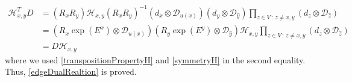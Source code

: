 \documentclass[10pt]{article}
\numberwithin{equation}{section}
\numberwithin{equation}{subsection}
\newcommand{\dd}{\mathcal{D}_{u(x)}}
\begin{document}

\begin{equation}
    \begin{split}
        \mathcal{H}_{x,y}^{T}D&=(R_{x}R_{y})\mathcal{H}_{x,y}(R_{x}R_{y})^{-1}\left(d_{x}\otimes\dd\right)\left(d_{y}\otimes\mathcal{D}_{\widehat{y}}\right)\prod_{z\in V\,:\, z\neq x,y}\left(d_{z}\otimes \mathcal{D}_{\widehat{z}}\right)
        \\&=\left(R_{x}\exp{(E^{x})}\otimes \dd\right)\left(R_{y}\exp{(E^{y})}\otimes \mathcal{D}_{\widehat{y}}\right)\mathcal{H}_{x,y}\prod_{z\in V\,:\, z\neq x,y}\left(d_{z}\otimes \mathcal{D}_{\widehat{z}}\right)
        \\&=
        D\mathcal{H}_{x,y}
    \end{split}
\end{equation}
 where we used \eqref{transpositionPropertyH} and \eqref{symmetryH} in the second equality. Thus, \eqref{edgeDualRealtion} is proved. 
\end{document}
